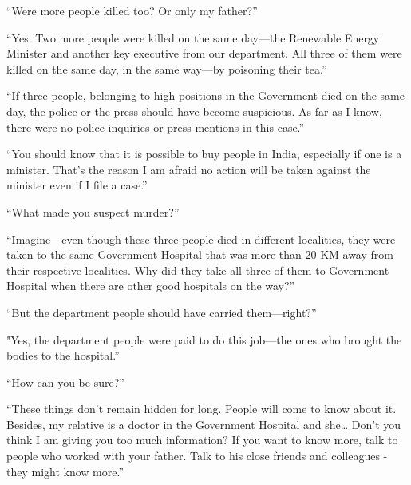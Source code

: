 “Were more people killed too? Or only my father?”

“Yes. Two more people were killed on the same day—the Renewable Energy
Minister and another key executive from our department. All three of them were
killed on the same day, in the same way—by poisoning their tea.”

“If three people, belonging to high positions in the Government died on the same
day, the police or the press should have become suspicious. As far as I know,
there were no police inquiries or press mentions in this case.”

“You should know that it is possible to buy people in India, especially if one
is a minister. That's the reason I am afraid no action will be taken against the
minister even if I file a case.”

“What made you suspect murder?”

“Imagine—even though these three people died in different localities, they
were taken to the same Government Hospital that was more than 20 KM away from
their respective localities. Why did they take all three of them to Government
Hospital when there are other good hospitals on the way?”

“But the department people should have carried them—right?”

"Yes, the department people were paid to do this job—the ones who brought the
bodies to the hospital.”

“How can you be sure?”

“These things don't remain hidden for long. People will come to know about it.
Besides, my relative is a doctor in the Government Hospital and she… Don't
you think I am giving you too much information? If you want to know more, talk
to people who worked with your father. Talk to his close friends and colleagues
- they might know more.”